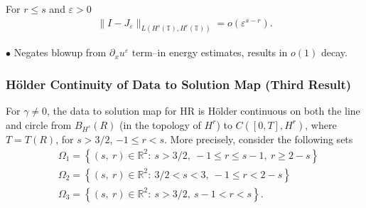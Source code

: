 \documentclass{beamer}
\newcommand{\rr}{\mathbb{R}}
\newcommand{\p}{\partial}
\newcommand{\ci}{\mathbb{T}}
\newcommand{\ee}{\varepsilon}
\begin{document}
\begin{frame}
  \begin{lemma}
For $r \le s$ and $\ee>0$
%
%
\begin{equation*}
\begin{split}
\|I - J_\ee\|_{L(H^s(\ci), H^r(\ci))} = o(\ee^{s-r}).
\end{split}
\end{equation*}
%
%
\end{lemma}
$\bullet$ Negates blowup from $\p_{x} u^{\ee}$ term--in energy estimates, results in $o(1)$ decay.
\end{frame}
\begin{frame}
  \frametitle{H\"older Continuity of Data to Solution Map (Third Result)}
\begin{theorem}
For $\gamma \neq 0$, the
data to solution map for HR is H\"older continuous on both the line and circle from $B_{H^{s}}(R)$ (in
the topology of $H^{r}$) to $C([0, T], H^{r})$, where $T = T(R)$, for $s >
3/2$, $-1 \le r < s$. More
precisely, consider the following sets 
%
%
\begin{equation*}
\begin{split}
& \Omega_{1} = \left\{ (s, \ r) \in \rr^{2}:
\ s>3/2, \ -1 \le r \le s-1, \  r \ge 2 -s  \right\}
\\
& \Omega_{2} = \left\{ (s, \ r) \in \rr^{2}:
\ 3/2 < s < 3, \ -1 \le r < 2-s \right\}
\\
& \Omega_{3} = \left\{ (s, \ r) \in \rr^{2}:
\  s>3/2, \  s-1 < r < s  \right\}.
\end{split}
\end{equation*}
%
\end{theorem}
\end{frame}
\begin{frame}
%
%
\begin{center}
\end{center}
%
\end{frame}
\end{document}
